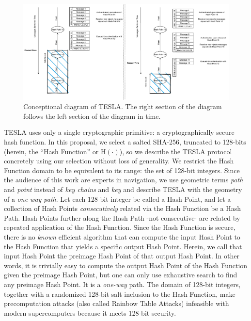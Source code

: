\documentclass[letterpaper,times]{IONconf/IONconf}
\begin{document}
\begin{figure}
\centering
\includegraphics[width=\linewidth]{fig/TESLADiagram.pdf}
\caption{Conceptional diagram of TESLA. The right section of the diagram follows the left section of the diagram in time.}
\label{fig: TESLA Diagram}
\end{figure}

TESLA uses only a single cryptographic primitive: a cryptographically secure hash function.
In this proposal, we select a salted SHA-256, truncated to 128-bits (herein, the ``Hash Function'' or $\textrm{H}(\cdot)$), so we describe the TESLA protocol concretely using our selection without loss of generality.
We restrict the Hash Function domain to be equivalent to its range: the set of 128-bit integers.
Since the audience of this work are experts in navigation, we use geometric terms {\em path} and {\em point} instead of {\em key chains} and {\em key} and describe TESLA with the geometry of a {\em one-way path}.
Let each 128-bit integer be called a Hash Point, and let a collection of Hash Points {\em consecutively} related via the Hash Function be a Hash Path.
Hash Points further along the Hash Path -not consecutive- are related by repeated application of the Hash Function.
Since the Hash Function is secure, there is no {\em known} efficient algorithm that can compute the input Hash Point to the Hash Function that yields a specific output Hash Point.
Herein, we call that input Hash Point the preimage Hash Point of that output Hash Point.
In other words, it is trivially easy to compute the output Hash Point of the Hash Function given the preimage Hash Point, but one can only use exhaustive search to find any preimage Hash Point.
It is a {\em one-way} path.
The domain of 128-bit integers, together with a randomized 128-bit salt inclusion to the Hash Function, make precomputation attacks (also called Rainbow Table Attacks) infeasible with modern supercomputers because it meets 128-bit security.
\end{document}
